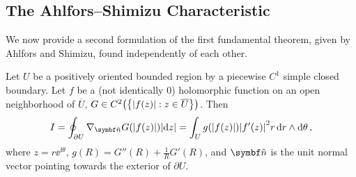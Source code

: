 \subsection{The Ahlfors--Shimizu Characteristic}
We now provide a second formulation of the first fundamental theorem, given by Ahlfors and Shimizu, found independently of each other. 
\begin{lemma}\label{lem:ahlforsshimizugreens}
    Let \(U\) be a positively oriented bounded region by a piecewise \(C^1\) simple closed boundary. Let \(f\) be a (not identically 0) holomorphic function on an open neighborhood of \(\overline{U}\), \(G\in C^2\qty(\cbraces{\abs{f(z)}}{z\in\overline{U}})\). Then
    \begin{equation}
        I=\oint_{\partial U}\nabla_{\vu{n}}G\qty(\abs{f(z)})\abs{\ddz}=\int_Ug\qty(\abs{f(z)})\abs{f'(z)}^2r\dd{r}\wedge\dd{\theta},\label{eq:ahlforsshimizugreens_statement}
    \end{equation}
    where \(z=r\ee^{\ii\theta}\), \(g(R)=G''(R)+\tfrac1RG'(R)\), and \(\vu{n}\) is the unit normal vector pointing towards the exterior of \(\partial U\).
\end{lemma}
